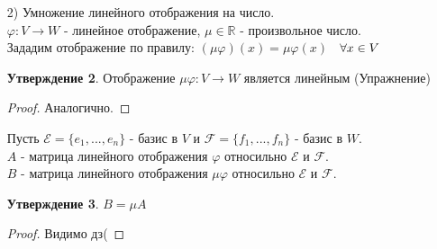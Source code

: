 \documentclass[a4paper, 12pt]{article}
\newcommand{\R}{\mathbb R}
\renewcommand{\phi}{\varphi}
\newcommand\tab[1][.5cm]{\hspace*{#1}}
\theoremstyle{definition}
\newtheorem*{subtheorem}{Утверждение}
\begin{document}
\begin{itemize}
    $A_1$ - матрица линейного отображения $\phi_1$ относильно $\mathcal{E}$ и $\mathcal{F}$. \\
    $A_2$ - матрица линейного отображения $\phi_2$ относильно $\mathcal{E}$ и $\mathcal{F}$. \\
    $B$ - матрица линейного отображения $\phi_1+\phi_2$ относильно $\mathcal{E}$ и $\mathcal{F}$.
    \begin{subtheorem}
      $B=A_1 + A_2$ 
    \end{subtheorem} 
    \begin{proof}
      Размеры совпадают
      $$\phi_1(e_i) = a_{1i}f_1 + \cdots + a_{mi}f_m$$
      $$\phi_2(e_i) = \widetilde{a_{1i}} f_1 + \cdots + \widetilde{a_{mi}} f_m$$ 
      $$(\phi_1 + \phi_2)(e_i) = b_{1i}f_1 + \cdots + b_{mi}f_m$$ 
      $$(\phi_1 + \phi_2)(e_i) = \phi_1(e_i) + \phi_2(e_i) = (a_{1i}f_1 + \cdots + a_{mi}f_m) + (\widetilde{a_{1i}} f_1 + \cdots + \widetilde{a_{mi}} f_m) =$$ $$= (a_{1i} + \widetilde{a_{1i}})f_1 + \cdots + (a_{mi} + \widetilde{a_{mi}})f_m$$
      Т.к. разложение по базису единственное, то
      $$b_{1i} = a_{1i} + \widetilde{a_{1i}} ,..., b_{mi} = a_{mi} + \widetilde{a_{mi}} \Longrightarrow b_{ij} = a_{ij} + \widetilde{a_{ij}} \Longrightarrow B = A_1 + A_2$$ 
    \end{proof} 
    \item[2)] Умножение линейного отображения на число. \\
    $\phi: V \to W$ - линейное отображение, $\mu \in \R$ - произвольное число. \\
    Зададим отображение по правилу: $(\mu \phi)(x) = \mu \phi(x)$ $\tab[0.2cm] \forall x \in V$ 
    \begin{subtheorem}
      Отображение $\mu \phi: V \to W$ является линейным (Упражнение) 
    \end{subtheorem}
    \begin{proof}
      Аналогично.
    \end{proof} 
    Пусть $\mathcal{E}  = \{e_1,...,e_n\}$ - базис в $V$ и $\mathcal{F}  = \{f_1,...,f_n\}$ - базис в $W$. \\
    $A$ - матрица линейного отображения $\phi$ относильно $\mathcal{E}$ и $\mathcal{F}$. \\
    $B$ - матрица линейного отображения $\mu\phi$ относильно $\mathcal{E}$ и $\mathcal{F}$.
    \begin{subtheorem}
      $B=\mu A$ 
    \end{subtheorem} 
    \begin{proof}
      Видимо дз(

\end{proof}
\end{itemize}
\end{document}
